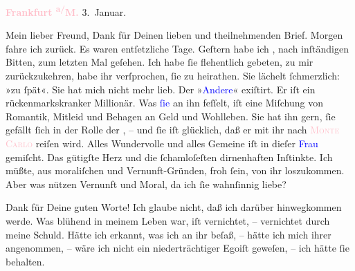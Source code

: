 \pstart
           \raggedleft{}\textcolor{gray}{\textbf{\textcolor{pink}{Frankfurt \textsuperscript{a/}M.}{}\ledrightnote{\textcolor{pink}{Frankfurt am Main}}}}{ }3. Januar.\pend
           
\pstart\center{}Mein lieber Freund,\pend
\pstart
           Dank für Deinen lieben und theilnehmenden Brief. Morgen fahre ich zurück. Es waren
               entſetzliche Tage. Geſtern habe ich \label{K_L03360-1v}\label{K_L03360-1h}, nach  inſtändigen Bitten, zum letzten Mal
               geſehen. Ich habe ſie flehentlich gebeten, zu mir zurückzukehren, habe ihr
               verſprochen, ſie zu heirathen. Sie lächelt ſchmerzlich: »zu ſpät«. Sie hat mich nicht
               mehr lieb. Der {\pb}»\textcolor{blue}{Andere}{}\ledrightnote{{$\rightarrow$}\textcolor{blue}{?? [Partner von Theodore Rottenberg, Ende 1902/Anfang 1903]}}« exiſtirt. Er iſt ein rückenmarkskranker Millionär.
               Was \textcolor{blue}{ſie}{}\ledrightnote{{$\rightarrow$}\textcolor{blue}{Theodore Rottenberg}} an ihn feſſelt, iſt
               eine Miſchung von Romantik, Mitleid und Behagen an Geld und Wohlleben. Sie hat ihn
               gern, ſie gefällt ſich in der Rolle der \label{K_L03360-2v}\label{K_L03360-2h}, – und ſie iſt glücklich,
               daß er mit ihr nach \textsc{\textcolor{pink}{Monte Carlo}{}\ledrightnote{\textcolor{pink}{Monte Carlo}}} reiſen wird. Alles Wundervolle und alles Gemeine iſt in dieſer \textcolor{blue}{Frau}{}\ledrightnote{{$\rightarrow$}\textcolor{blue}{Theodore Rottenberg}} gemiſcht. Das gütigſte
               Herz und die ſchamloſeſten dirnenhaften Inſtinkte. Ich müßte, aus moraliſchen und
               Vernunft-Gründen, froh ſein, von ihr loszukommen. Aber was nützen Vernunft und Moral,
               da ich ſie wahnſinnig liebe?\pend
           
\pstart
           Dank für Deine guten Worte! {\pb}Ich glaube nicht, daß
               ich darüber hinwegkommen werde.  Was blühend in meinem Leben war, iſt vernichtet, –
               vernichtet durch meine Schuld. Hätte ich erkannt, was ich an ihr beſaß, – hätte ich
               mich ihrer angenommen, – wäre ich nicht ein niederträchtiger Egoiſt geweſen, – ich
               hätte ſie behalten.\pend
           
